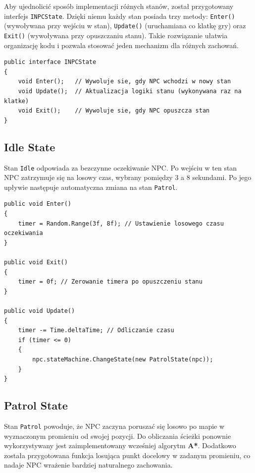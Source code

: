 \documentclass[a4paper,12pt]{book} %
\begin{document}
Aby ujednolicić sposób implementacji różnych stanów, został przygotowany interfejs \texttt{INPCState}.  
Dzięki niemu każdy stan posiada trzy metody: \texttt{Enter()} (wywoływana przy wejściu w stan), \texttt{Update()} (uruchamiana co klatkę gry) oraz \texttt{Exit()} (wywoływana przy opuszczaniu stanu).  
Takie rozwiązanie ułatwia organizację kodu i pozwala stosować jeden mechanizm dla różnych zachowań.

\begin{lstlisting}[language=CSharp, caption={Interfejs dla wszystkich stanów NPC}, label={lst:npcstate_interface}]
public interface INPCState
{
    void Enter();   // Wywoluje sie, gdy NPC wchodzi w nowy stan
    void Update();  // Aktualizacja logiki stanu (wykonywana raz na klatke)
    void Exit();    // Wywoluje sie, gdy NPC opuszcza stan
}
\end{lstlisting}

\subsection*{Idle State}

Stan \texttt{Idle} odpowiada za bezczynne oczekiwanie NPC.  
Po wejściu w ten stan NPC zatrzymuje się na losowy czas, wybrany pomiędzy 3 a 8 sekundami.  
Po jego upływie następuje automatyczna zmiana na stan \texttt{Patrol}.  

\begin{lstlisting}[language=CSharp, caption={Implementacja stanu Idle}, label={lst:idle_state}]
public void Enter()
{
    timer = Random.Range(3f, 8f); // Ustawienie losowego czasu oczekiwania
}

public void Exit()
{
    timer = 0f; // Zerowanie timera po opuszczeniu stanu
}

public void Update()
{
    timer -= Time.deltaTime; // Odliczanie czasu
    if (timer <= 0)
    {
        npc.stateMachine.ChangeState(new PatrolState(npc));
    }
}
\end{lstlisting}

\subsection*{Patrol State}

Stan \texttt{Patrol} powoduje, że NPC zaczyna poruszać się losowo po mapie w wyznaczonym promieniu od swojej pozycji.  
Do obliczania ścieżki ponownie wykorzystywany jest zaimplementowany wcześniej algorytm \textbf{A*}.  
Dodatkowo została przygotowana funkcja losująca punkt docelowy w zadanym promieniu, co nadaje NPC wrażenie bardziej naturalnego zachowania.  
\end{document}
